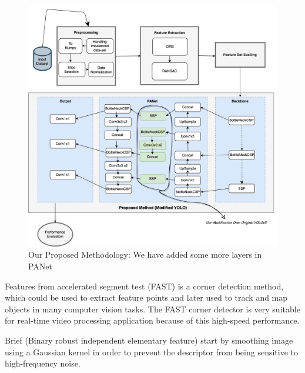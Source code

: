 \begin{figure}[ht]
    \centering
    \includegraphics[max width=\textwidth]{images/ours/YOLO_M.drawio.png}
   \caption[Our Proposed Methodology]{Our Proposed Methodology: We have added some more layers in PANet}
    \label{fig:proposedmethodology}
\end{figure}


Features from accelerated segment test (FAST) is a corner detection method, which could be used to extract feature points and later used to track and map objects in many computer vision tasks. The FAST corner detector is very suitable for real-time video processing application because of this high-speed performance.

Brief (Binary robust independent elementary feature) start by smoothing image using a Gaussian kernel in order to prevent the descriptor from being sensitive to high-frequency noise.


